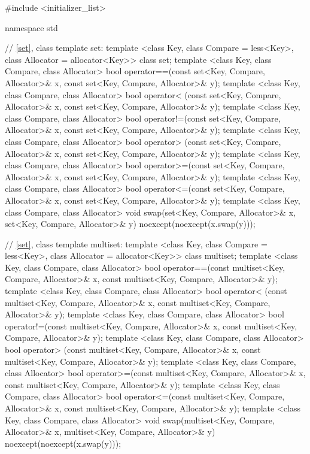 \begin{codeblock}
#include <initializer_list>

namespace std {
  // \ref{set}, class template set:
  template <class Key, class Compare = less<Key>,
            class Allocator = allocator<Key>>
    class set;
  template <class Key, class Compare, class Allocator>
    bool operator==(const set<Key, Compare, Allocator>& x,
                    const set<Key, Compare, Allocator>& y);
  template <class Key, class Compare, class Allocator>
    bool operator< (const set<Key, Compare, Allocator>& x,
                    const set<Key, Compare, Allocator>& y);
  template <class Key, class Compare, class Allocator>
    bool operator!=(const set<Key, Compare, Allocator>& x,
                    const set<Key, Compare, Allocator>& y);
  template <class Key, class Compare, class Allocator>
    bool operator> (const set<Key, Compare, Allocator>& x,
                    const set<Key, Compare, Allocator>& y);
  template <class Key, class Compare, class Allocator>
    bool operator>=(const set<Key, Compare, Allocator>& x,
                    const set<Key, Compare, Allocator>& y);
  template <class Key, class Compare, class Allocator>
    bool operator<=(const set<Key, Compare, Allocator>& x,
                    const set<Key, Compare, Allocator>& y);
  template <class Key, class Compare, class Allocator>
    void swap(set<Key, Compare, Allocator>& x,
              set<Key, Compare, Allocator>& y)
      noexcept(noexcept(x.swap(y)));

  // \ref{set}, class template multiset:
  template <class Key, class Compare = less<Key>,
            class Allocator = allocator<Key>>
    class multiset;
  template <class Key, class Compare, class Allocator>
    bool operator==(const multiset<Key, Compare, Allocator>& x,
                    const multiset<Key, Compare, Allocator>& y);
  template <class Key, class Compare, class Allocator>
    bool operator< (const multiset<Key, Compare, Allocator>& x,
                    const multiset<Key, Compare, Allocator>& y);
  template <class Key, class Compare, class Allocator>
    bool operator!=(const multiset<Key, Compare, Allocator>& x,
                    const multiset<Key, Compare, Allocator>& y);
  template <class Key, class Compare, class Allocator>
    bool operator> (const multiset<Key, Compare, Allocator>& x,
                    const multiset<Key, Compare, Allocator>& y);
  template <class Key, class Compare, class Allocator>
    bool operator>=(const multiset<Key, Compare, Allocator>& x,
                    const multiset<Key, Compare, Allocator>& y);
  template <class Key, class Compare, class Allocator>
    bool operator<=(const multiset<Key, Compare, Allocator>& x,
                    const multiset<Key, Compare, Allocator>& y);
  template <class Key, class Compare, class Allocator>
    void swap(multiset<Key, Compare, Allocator>& x,
              multiset<Key, Compare, Allocator>& y)
      noexcept(noexcept(x.swap(y)));
}
\end{codeblock}

